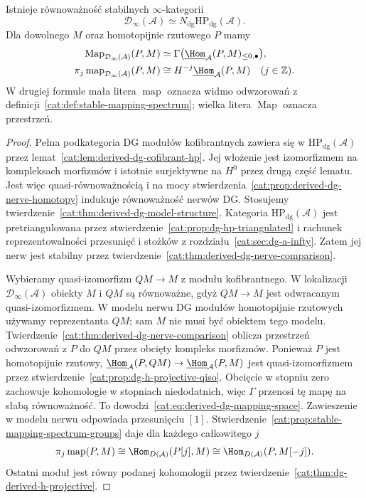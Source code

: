 \begin{twierdzenie}\label{cat:thm:derived-dg-hp-nerve}
Istnieje równoważność stabilnych $\infty$-kategorii
\[
 \mathcal D_\infty(\mathcal A)
 \simeq N_{\mathrm{dg}}\mathrm{HP}_{\mathrm{dg}}(\mathcal A).
\]
Dla dowolnego $M$ oraz homotopijnie rzutowego $P$ mamy
\begin{align}
 \operatorname{Map}_{\mathcal D_\infty(\mathcal A)}(P,M)
 &\simeq \Gamma\bigl(\underline{\Hom}_{\mathcal A}(P,M)_{\leq0,\bullet}\bigr),
 \label{cat:eq:derived-dg-mapping-space}\\
 \pi_j\operatorname{map}_{\mathcal D_\infty(\mathcal A)}(P,M)
 &\cong H^{-j}\underline{\Hom}_{\mathcal A}(P,M)
 \quad(j\in\mathbb Z).
 \label{cat:eq:derived-dg-mapping-spectrum}
\end{align}
W drugiej formule mała litera $\operatorname{map}$ oznacza widmo odwzorowań z definicji~\ref{cat:def:stable-mapping-spectrum}; wielka litera $\operatorname{Map}$ oznacza przestrzeń.
\end{twierdzenie}
\begin{proof}
Pełna podkategoria DG modułów kofibrantnych zawiera się w $\mathrm{HP}_{\mathrm{dg}}(\mathcal A)$ przez lemat~\ref{cat:lem:derived-dg-cofibrant-hp}. Jej włożenie jest izomorfizmem na kompleksach morfizmów i istotnie surjektywne na $H^0$ przez drugą część lematu. Jest więc quasi-równoważnością i na mocy stwierdzenia~\ref{cat:prop:derived-dg-nerve-homotopy} indukuje równoważność nerwów DG. Stosujemy twierdzenie~\ref{cat:thm:derived-dg-model-structure}. Kategoria $\mathrm{HP}_{\mathrm{dg}}(\mathcal A)$ jest pretriangulowana przez stwierdzenie~\ref{cat:prop:dg-hp-triangulated} i rachunek reprezentowalności przesunięć i stożków z rozdziału~\ref{cat:sec:dg-a-infty}. Zatem jej nerw jest stabilny przez twierdzenie~\ref{cat:thm:derived-dg-nerve-comparison}.

Wybieramy quasi-izomorfizm $Q M\to M$ z modułu kofibrantnego. W lokalizacji $\mathcal D_\infty(\mathcal A)$ obiekty $M$ i $QM$ są równoważne, gdyż $QM\to M$ jest odwracanym quasi-izomorfizmem. W modelu nerwu DG modułów homotopijnie rzutowych używamy reprezentanta $QM$; sam $M$ nie musi być obiektem tego modelu. Twierdzenie~\ref{cat:thm:derived-dg-nerve-comparison} oblicza przestrzeń odwzorowań z $P$ do $QM$ przez obcięty kompleks morfizmów. Ponieważ $P$ jest homotopijnie rzutowy, $\underline{\Hom}_{\mathcal A}(P,QM)\to\underline{\Hom}_{\mathcal A}(P,M)$ jest quasi-izomorfizmem przez stwierdzenie~\ref{cat:prop:dg-h-projective-qiso}. Obcięcie w stopniu zero zachowuje kohomologie w stopniach niedodatnich, więc $\Gamma$ przenosi tę mapę na słabą równoważność. To dowodzi~\eqref{cat:eq:derived-dg-mapping-space}. Zawieszenie w modelu nerwu odpowiada przesunięciu $[1]$. Stwierdzenie~\ref{cat:prop:stable-mapping-spectrum-groups} daje dla każdego całkowitego $j$
\[
 \pi_j\operatorname{map}(P,M)
 \cong\Hom_{D(\mathcal A)}(P[j],M)
 \cong\Hom_{D(\mathcal A)}(P,M[-j]).
\]
Ostatni moduł jest równy podanej kohomologii przez twierdzenie~\ref{cat:thm:dg-derived-h-projective}.
\end{proof}

